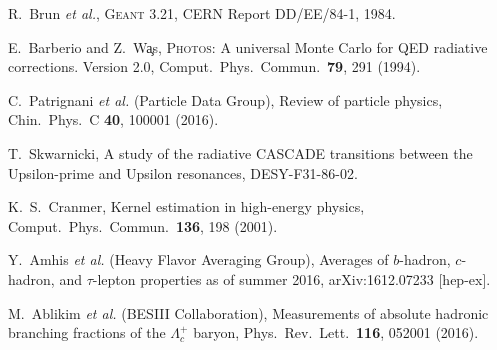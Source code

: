 \documentclass[aps,prl,twocolumn,superscriptaddress,showpacs,preprintnumbers,amsmath,amssymb]{revtex4-1}
\begin{document}
\begin{thebibliography}{99}
    R.~Brun {\em et al.}, {\mbox{\textsc{Geant}}\xspace} 3.21, CERN Report DD/EE/84-1, 1984.

  E.~Barberio and Z.~W\c{a}s,
 {\mbox{\textsc{Photos}}\xspace}: A universal Monte Carlo for QED radiative corrections. Version 2.0,
  Comput.\ Phys.\ Commun.\  {\bf 79}, 291 (1994).
 
  C.~Patrignani {\it et al.}  (Particle Data Group),
 Review of particle physics,
  Chin.\ Phys.\ C {\bf 40}, 100001 (2016).

  T.~Skwarnicki,
 A study of the radiative CASCADE transitions between the Upsilon-prime and Upsilon resonances,
  DESY-F31-86-02.

  K.~S.~Cranmer,
  Kernel estimation in high-energy physics,
  Comput.\ Phys.\ Commun.\  {\bf 136}, 198 (2001).

  Y.~Amhis {\it et al.} (Heavy Flavor Averaging Group),
 Averages of $b$-hadron, $c$-hadron, and $\tau$-lepton properties as of summer 2016,
  arXiv:1612.07233 [hep-ex].

  M.~Ablikim {\it et al.} (BESIII Collaboration),
  Measurements of absolute hadronic branching fractions of the $\Lambda_{c}^{+}$ baryon,
  Phys.\ Rev.\ Lett.\  {\bf 116}, 052001 (2016).


\end{thebibliography}
\end{document}
